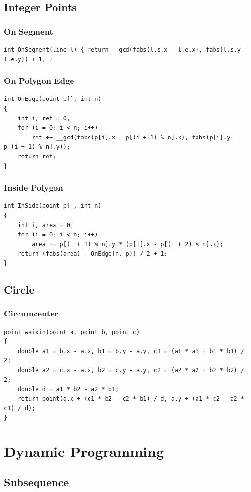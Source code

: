 \documentclass[twoside]{article}
\begin{document}
\subsection{Integer Points}
\subsubsection{On Segment}
\begin{lstlisting}
int OnSegment(line l) { return __gcd(fabs(l.s.x - l.e.x), fabs(l.s.y - l.e.y)) + 1; }
\end{lstlisting}
\subsubsection{On Polygon Edge}
\begin{lstlisting}
int OnEdge(point p[], int n)
{
    int i, ret = 0;
    for (i = 0; i < n; i++)
        ret += __gcd(fabs(p[i].x - p[(i + 1) % n].x), fabs(p[i].y - p[(i + 1) % n].y));
    return ret;
}
\end{lstlisting}
\subsubsection{Inside Polygon}
\begin{lstlisting}
int InSide(point p[], int n)
{
    int i, area = 0;
    for (i = 0; i < n; i++)
        area += p[(i + 1) % n].y * (p[i].x - p[(i + 2) % n].x);
    return (fabs(area) - OnEdge(n, p)) / 2 + 1;
}
\end{lstlisting}
\subsection{Circle}
\subsubsection{Circumcenter}
\begin{lstlisting}
point waixin(point a, point b, point c)
{
    double a1 = b.x - a.x, b1 = b.y - a.y, c1 = (a1 * a1 + b1 * b1) / 2;
    double a2 = c.x - a.x, b2 = c.y - a.y, c2 = (a2 * a2 + b2 * b2) / 2;
    double d = a1 * b2 - a2 * b1;
    return point(a.x + (c1 * b2 - c2 * b1) / d, a.y + (a1 * c2 - a2 * c1) / d);
}
\end{lstlisting}
\clearpage\section{Dynamic Programming}
\subsection{Subsequence}
\end{document}

